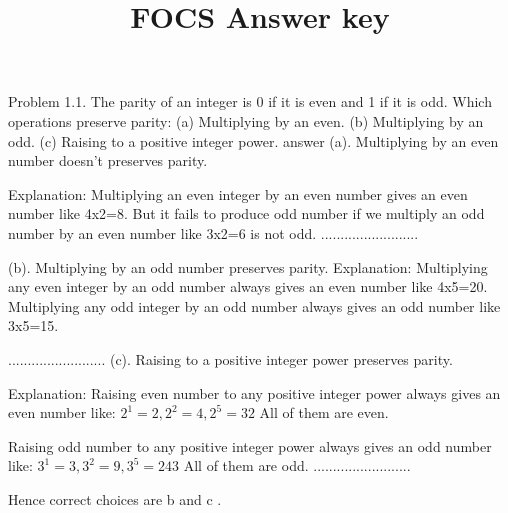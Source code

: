 \documentclass[10pt]{article}
\title{FOCS Answer key }
\author{}
\date{}
\begin{document}
\maketitle
Problem 1.1. The parity of an integer is 0 if it is even and 1 if it is odd. Which operations preserve parity:
(a) Multiplying by an even.
(b) Multiplying by an odd.
(c) Raising to a positive integer power.
answer
(a). Multiplying by an even number doesn't preserves parity.

Explanation:
Multiplying an even integer by an even number gives an even number like 4x2=8. But it fails to produce odd number if we multiply an odd number by an even number like 3x2=6 is not odd.
.........................

(b). Multiplying by an odd number preserves parity. Explanation: Multiplying any even integer by an odd number always gives an even number like 4x5=20.
Multiplying any odd integer by an odd number always gives an odd number like 3x5=15.

.........................
(c). Raising to a positive integer power preserves parity.

Explanation: Raising even number to any positive integer power always gives an even number like:
$2^1=2, 2^2=4, 2^5=32$
All of them are even.

Raising odd number to any positive integer power always gives an odd number like:
$3^1=3, 3^2=9, 3^5=243$
All of them are odd.
.........................

Hence correct choices are b and c .
\end{document}
